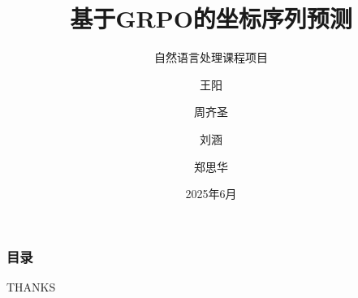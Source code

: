 \documentclass[aspectratio=169]{beamer}
\title{基于GRPO的坐标序列预测}
\subtitle{自然语言处理课程项目}
\author{王阳 \and 周齐圣 \and 刘涵 \and 郑思华}
\institute{计算机科学与技术学院}
\date{2025年6月}
\begin{document}
\begin{frame}
    \begin{figure}
    \end{figure}
    \titlepage
\end{frame}

\begin{frame}
    \frametitle{目录}
    \tableofcontents
\end{frame}


\begin{frame}
    \begin{center}
        {\Huge THANKS}
    \end{center}
\end{frame}
\end{document}
